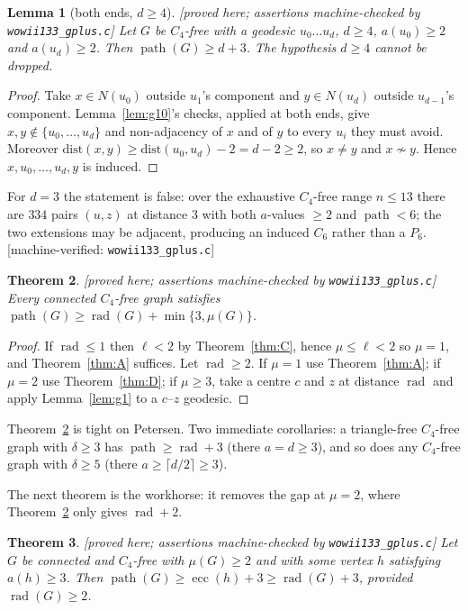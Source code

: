 \documentclass[11pt]{article}
\theoremstyle{plain}
\newtheorem{theorem}{Theorem}[section]
\newtheorem{lemma}[theorem]{Lemma}
\theoremstyle{definition}
\theoremstyle{remark}
\numberwithin{equation}{section}
\newcommand{\rad}{\operatorname{rad}}
\newcommand{\ecc}{\operatorname{ecc}}
\newcommand{\pth}{\operatorname{path}}
\newcommand{\statusbox}[1]{{\small\sloppy\textsf{[#1]}}}
\newcommand{\PRV}[1]{\statusbox{proved here; assertions machine-checked by \texttt{#1}}}
\newcommand{\MV}[1]{\statusbox{machine-verified: \texttt{#1}}}
\begin{document}
\begin{lemma}[both ends, $d \ge 4$]\label{lem:g9}
\PRV{wowii133\_gplus.c}
Let $G$ be $C_4$-free with a geodesic $u_0 \dots u_d$, $d \ge 4$, $a(u_0)\ge 2$ and
$a(u_d) \ge 2$. Then $\pth(G) \ge d+3$. The hypothesis $d \ge 4$ cannot be dropped.
\end{lemma}

\begin{proof}
Take $x \in N(u_0)$ outside $u_1$'s component and $y \in N(u_d)$ outside $u_{d-1}$'s
component. Lemma~\ref{lem:g10}'s checks, applied at both ends, give $x,y \notin
\{u_0,\dots,u_d\}$ and non-adjacency of $x$ and of $y$ to every $u_i$ they must avoid.
Moreover $\mathrm{dist}(x,y) \ge \mathrm{dist}(u_0,u_d) - 2 = d - 2 \ge 2$, so $x \ne y$ and
$x \not\sim y$. Hence $x, u_0, \dots, u_d, y$ is induced.
\end{proof}

For $d = 3$ the statement is false: over the exhaustive $C_4$-free range $n \le 13$ there are
$334$ pairs $(u,z)$ at distance $3$ with both $a$-values $\ge 2$ and $\pth < 6$; the two
extensions may be adjacent, producing an induced $C_6$ rather than a $P_6$. \MV{wowii133\_gplus.c}

\begin{theorem}\label{thm:g}
\PRV{wowii133\_gplus.c}
Every connected $C_4$-free graph satisfies $\pth(G) \ge \rad(G) + \min\{3, \mu(G)\}$.
\end{theorem}

\begin{proof}
If $\rad \le 1$ then $\ell < 2$ by Theorem~\ref{thm:C}, hence $\mu \le \ell < 2$ so
$\mu = 1$, and Theorem~\ref{thm:A} suffices. Let $\rad \ge 2$. If $\mu = 1$ use
Theorem~\ref{thm:A}; if $\mu = 2$ use Theorem~\ref{thm:D}; if $\mu \ge 3$, take a centre $c$
and $z$ at distance $\rad$ and apply Lemma~\ref{lem:g1} to a $c$--$z$ geodesic.
\end{proof}

Theorem~\ref{thm:g} is tight on Petersen. Two immediate corollaries: a triangle-free
$C_4$-free graph with $\delta \ge 3$ has $\pth \ge \rad + 3$ (there $a = d \ge 3$), and so
does any $C_4$-free graph with $\delta \ge 5$ (there $a \ge \lceil d/2\rceil \ge 3$).

The next theorem is the workhorse: it removes the gap at $\mu = 2$, where
Theorem~\ref{thm:g} only gives $\rad + 2$.

\begin{theorem}\label{thm:gplus}
\PRV{wowii133\_gplus.c}
Let $G$ be connected and $C_4$-free with $\mu(G) \ge 2$ and with some vertex $h$ satisfying
$a(h) \ge 3$. Then $\pth(G) \ge \ecc(h) + 3 \ge \rad(G) + 3$, provided $\rad(G) \ge 2$.
\end{theorem}
\end{document}

